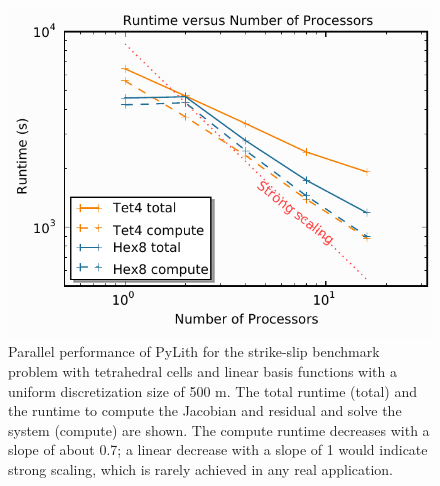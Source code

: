 \noindent \begin{center}
\begin{figure}[H]
\begin{centering}
\includegraphics[scale=0.75]{benchmarks/strikeslip/figs/scaling}
\par\end{centering}

\caption{Parallel performance of PyLith for the strike-slip benchmark problem
with tetrahedral cells and linear basis functions with a uniform discretization
size of 500 m. The total runtime (total) and the runtime to compute
the Jacobian and residual and solve the system (compute) are shown.
The compute runtime decreases with a slope of about 0.7; a linear
decrease with a slope of 1 would indicate strong scaling,  which is
rarely achieved in any real application. \label{fig:benchmark:strikeslip:scaling}}
\end{figure}

\par\end{center}
